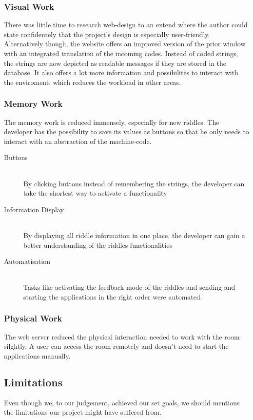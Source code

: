 \subsubsection{Visual Work}
There was little time to research web-design to an extend where the author could state confidentely that the project's design is especially user-friendly.
Alternatively though, the website offers an improved version of the prior window with an integrated translation of the incoming codes.
Instead of coded strings, the strings are now depicted as readable messages if they are stored in the database.
It also offers a lot more information and possibilites to interact with the enviroment, which reduces the workload in other areas.
\subsubsection{Memory Work}
The memory work is reduced immensely, especially for new riddles. 
The developer has the possibility to save its values as buttons so that he only needs to interact with an abstraction of the machine-code.
\begin{description}
    \item [Buttons] \hfill \\
    By clicking buttons instead of remembering the strings, the developer can take the shortest way to activate a functionality
    \item [Information Display] \hfill \\
    By displaying all riddle information in one place, the developer can gain a better understanding of the riddles functionalities
    \item [Automatisation] \hfill \\
    Tasks like activating the feedback mode of the riddles and sending 
    and starting the applications in the right order were automated.
\end{description}
\subsubsection{Physical Work}
The web server reduced the physical interaction needed to work with the room  silghtly. 
A user can access the room remotely and doesn't need to start the applications manually.

\subsection{Limitations}
Even though we, to our judgement, achieved our set goals, 
we should mentions the limitations our project might have suffered from.

